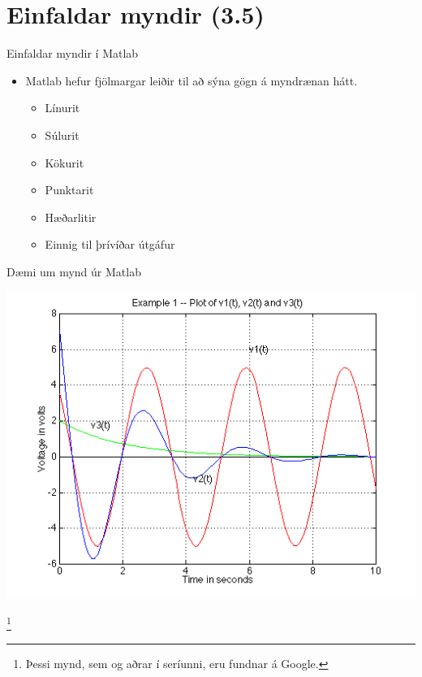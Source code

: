 \documentclass[handout]{beamer}
\begin{document}
\section{Einfaldar myndir (3.5)}

\begin{frame}{Einfaldar myndir í Matlab}
\begin{itemize}
 \item Matlab hefur fjölmargar leiðir til að sýna gögn á myndrænan hátt.
 \begin{itemize}
  \item Línurit
  \item Súlurit
  \item Kökurit
  \item Punktarit
  \item Hæðarlitir
  \item Einnig til þrívíðar útgáfur
 \end{itemize}
\end{itemize}
\end{frame}

\begin{frame}{Dæmi um mynd úr Matlab}
\vspace{2\baselineskip}
\begin{center}
\includegraphics[height=0.6\textheight]{Pics/plot-example1}
\end{center}\footnote{Þessi mynd, sem og aðrar í seríunni, eru fundnar á Google.}
\end{frame}
\end{document}
